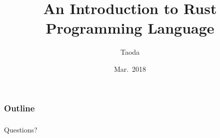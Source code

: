 \documentclass[lualatex]{beamer}
\title[Rust]{An Introduction to Rust Programming Language}
\author{Taoda}
\institute{Alibaba Cloud}
\date{Mar.\ 2018}
\begin{document}
\begin{frame}
\titlepage
\end{frame}

\begin{frame}
  \frametitle{Outline}
  \tableofcontents
\end{frame}

\begin{frame}
  \frametitle{}
  \begin{center}
    \Huge
    Questions?
  \end{center}
\end{frame}
\end{document}
